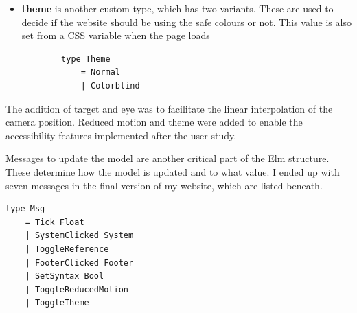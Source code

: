 \documentclass{l4proj}
\begin{document}
\begin{itemize}
    \item \textbf{theme} is another custom type, which has two variants.  These are used to decide if the website should be using the safe colours or not.  This value is also set from a CSS variable when the page loads

    \begin{lstlisting}
        type Theme
            = Normal
            | Colorblind

    \end{lstlisting}
\end{itemize}

The addition of target and eye was to facilitate the linear interpolation of the camera position.  Reduced motion and theme were added to enable the accessibility features implemented after the user study.

Messages to update the model are another critical part of the Elm structure. These determine how the model is updated and to what value.  I ended up with seven messages in the final version of my website, which are listed beneath.

\begin{lstlisting}
type Msg
    = Tick Float
    | SystemClicked System
    | ToggleReference
    | FooterClicked Footer
    | SetSyntax Bool
    | ToggleReducedMotion
    | ToggleTheme
\end{lstlisting}
\end{document}

